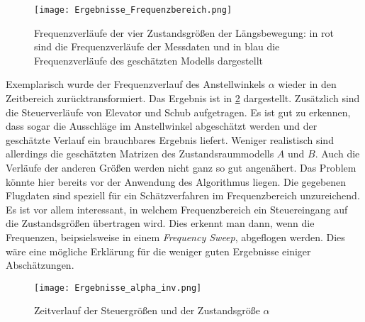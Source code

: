 \begin{figure}[h!]
	\centering
	\texttt{[image: Ergebnisse\_Frequenzbereich.png]}
	\caption{Frequenzverläufe der vier Zustandsgrößen der Längsbewegung: in rot sind die Frequenzverläufe der Messdaten und 
	in blau die Frequenzverläufe des geschätzten Modells dargestellt}
	\label{fig:Ergebnisse_f}
\end{figure}

Exemplarisch wurde der Frequenzverlauf des Anstellwinkels $\alpha$ wieder in den Zeitbereich zurücktransformiert. Das 
Ergebnis ist in \cref{fig:Ergebnisse_t} dargestellt. Zusätzlich sind die Steuerverläufe von Elevator und Schub aufgetragen. 
Es ist gut zu erkennen, dass sogar die Ausschläge im Anstellwinkel abgeschätzt werden und der geschätzte Verlauf ein 
brauchbares Ergebnis liefert. Weniger realistisch sind allerdings die geschätzten Matrizen des Zustandsraummodells $A$ und 
$B$. Auch die Verläufe der anderen Größen werden nicht ganz so gut angenähert. Das Problem könnte hier bereits vor der 
Anwendung des Algorithmus liegen. Die gegebenen Flugdaten sind speziell für ein Schätzverfahren im Frequenzbereich 
unzureichend. Es ist vor allem interessant, in welchem Frequenzbereich ein Steuereingang auf die Zustandsgrößen übertragen 
wird. Dies erkennt man dann, wenn die Frequenzen, beipsielsweise in einem \textit{Frequency Sweep}, abgeflogen werden. Dies 
wäre eine mögliche Erklärung für die weniger guten Ergebnisse einiger Abschätzungen.

\begin{figure}[h!]
	\centering
	\texttt{[image: Ergebnisse\_alpha\_inv.png]}
	\caption{Zeitverlauf der Steuergrößen und der Zustandsgröße $\alpha$}
	\label{fig:Ergebnisse_t}
\end{figure}

